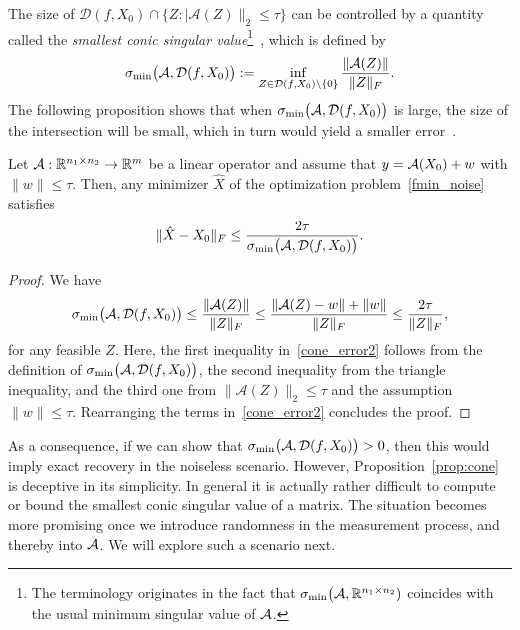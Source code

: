 The size of $\mathcal{D}(f,X_0) \cap \{Z: |\mathcal{A} \left(Z\right)\|_2\le \tau\}$ can be controlled by a quantity called the {\em smallest conic singular value}\footnote{The terminology originates in the fact that $\sigma_{\min}\big({\mathcal A},\mathbb{R}^{n_1\times n_2})$
coincides with the usual minimum singular value of ${\mathcal A}$.}~\cite{tropp2015convex,chandrasekaran2012convex,fuchs2022proof}, which is defined by
\begin{equation}\label{conesv}    
\sigma_{\min}\big({\mathcal A},\mathcal{D}(f,X_0)\big) :=   
\inf_{Z \in \mathcal{D}(f,X_0) \setminus \{0\}} \frac{\|{\mathcal A}(Z)\|}{\|Z\|_F}.
\end{equation}
The following proposition shows that when $\sigma_{\min}\big({\mathcal A},\mathcal{D}(f,X_0)\big)$ is large, the size of the intersection will be small, which in turn would yield a smaller error~\cite{tropp2015convex,chandrasekaran2012convex,fuchs2022proof}.
\begin{proposition} \label{prop:cone}
Let ${\mathcal A}: \mathbb{R}^{n_1\times n_2} \to \mathbb{R}^m$ be a linear operator and assume
that $y = {\mathcal A}(X_0)+w$ with $\|w\|\le \tau$.  Then, any minimizer $\hat{X}$ of the optimization problem~\eqref{fmin_noise} satisfies
\begin{equation}\label{cone_error1}
 \|\hat{X} - X_0\|_F \le \frac{2\tau}{\sigma_{\min}\big({\mathcal A},\mathcal{D}(f,X_0)\big)}.  
\end{equation}
\end{proposition}

\begin{proof}
We have 
\begin{equation}\label{cone_error2}
\sigma_{\min}\big({\mathcal A},\mathcal{D}(f,X_0)\big) \le \frac{\|{\mathcal A}(Z)\|}{\|Z\|_F} \le 
\frac{\|{\mathcal A}(Z)-w\|+\|w\|}{\|Z\|_F} \le 
\frac{2\tau}{\|Z\|_F},
\end{equation}
for any feasible $Z$. Here, the first inequality in~\eqref{cone_error2} follows from the definition of
$\sigma_{\min}\big({\mathcal A},\mathcal{D}(f,X_0)\big)$, the second inequality from the triangle inequality, and the third one from $\|\mathcal{A} \left(Z\right)\|_2\le \tau$ and the assumption $\|w\|\le \tau$. Rearranging the terms in~\eqref{cone_error2} concludes the proof.

\end{proof}
As a consequence, if we can show that $\sigma_{\min}\big({\mathcal A},\mathcal{D}(f,X_0)\big) > 0$, then this would imply exact recovery in the noiseless scenario. However, Proposition~\ref{prop:cone} is deceptive in its simplicity. In general it is actually rather difficult to compute or bound 
the smallest conic singular value of a matrix. The situation becomes more promising once we introduce  randomness in the measurement process, and thereby into ${\mathcal A}$. We will explore such a scenario next.

